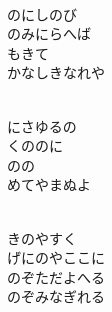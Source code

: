 \documentclass[10pt,b5j]{tarticle} %
\begin{document}
\begin{enumerate}
\begin{minipage}[c]{\blocksize}
        \vspace{\linespace}
        \item~\\
        のにしのび\\
        のみにらへば\\
        もきて\\
        かなしきなれや
        
        \vspace{\linespace}
        \item~\\
        にさゆるの\\
        くののに\\
        のの\\
        めてやまぬよ
        
        \vspace{\linespace}
        \item~\\
        きのやすく\\
        げにのやここに\\
        のぞただよへる\\
        のぞみなぎれる
    
    \end{minipage}
\end{enumerate} %
\end{document}
